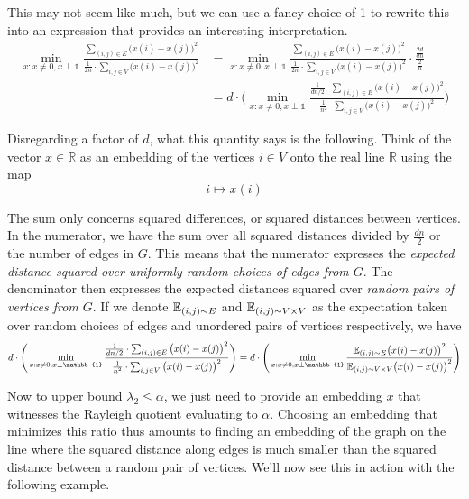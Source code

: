 This may not seem like much, but we can use a fancy choice of 1 to rewrite this into an expression that provides an interesting interpretation.
\begin{align*}
\min_{x : x \neq 0, x \perp \mathbb{1}}
  \frac{\sum_{(i, j) \in E} \big( x(i) - x(j) \big)^2}{\frac{1}{2n} \cdot \sum_{i, j \in V} \big( x(i) - x(j) \big)^2}
&= \min_{x : x \neq 0, x \perp \mathbb{1}}
  \frac{\sum_{(i, j) \in E} \big( x(i) - x(j) \big)^2}{\frac{1}{2n} \cdot \sum_{i, j \in V} \big( x(i) - x(j) \big)^2} \cdot \frac{\frac{2d}{dn}}{\frac{2}{n}} \\
&= d \cdot \Bigg( \min_{x : x \neq 0, x \perp \mathbb{1}}
  \frac{\frac{1}{dn / 2} \cdot \sum_{(i, j) \in E} \big( x(i) - x(j) \big)^2}{\frac{1}{n^2} \cdot \sum_{i, j \in V} \big( x(i) - x(j) \big)^2} \Bigg)
\end{align*}

Disregarding a factor of $d$, what this quantity says is the following. Think of the vector $x \in \mathbb{R}$ as an embedding of the vertices $i \in V$ onto the real line $\mathbb{R}$ using the map
\begin{equation*}
i \mapsto x(i)
\end{equation*}

The sum only concerns squared differences, or squared distances between vertices. In the numerator, we have the sum over all squared distances divided by $\frac{dn}{2}$ or the number of edges in $G$. This means that the numerator expresses the \emph{expected distance squared over uniformly random choices of edges from $G$}. The denominator then expresses the expected distances squared over \emph{random pairs of vertices from $G$}. If we denote $\mathbb{E}_{(i, j) \sim E}$ and $\mathbb{E}_{(i, j) \sim V \times V}$ as the expectation taken over random choices of edges and unordered pairs of vertices respectively, we have
\begin{equation}\label{eqn:expectation}
d \cdot \Bigg( \min_{x : x \neq 0, x \perp \mathbb{1}}
  \frac{\frac{1}{dn / 2} \cdot \sum_{(i, j) \in E} \big( x(i) - x(j) \big)^2}{\frac{1}{n^2} \cdot \sum_{i, j \in V} \big( x(i) - x(j) \big)^2} \Bigg)
= d \cdot \Bigg( \min_{x : x \neq 0, x \perp \mathbb{1}} \frac{\expect_{(i, j) \sim E} \big( x(i) - x(j) \big)^2}{\expect_{(i, j) \sim V \times V} \big( x(i) - x(j) \big)^2} \Bigg)
\end{equation}

Now to upper bound $\lambda_2 \leq \alpha$, we just need to provide an embedding $x$ that witnesses the Rayleigh quotient evaluating to $\alpha$. Choosing an embedding that minimizes this ratio thus amounts to finding an embedding of the graph on the line where the squared distance along edges is much smaller than the squared distance between a random pair of vertices. We'll now see this in action with the following example.

